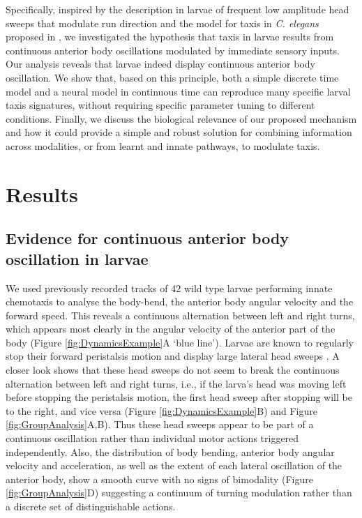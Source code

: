 \documentclass[11pt,a4paper]{article}
\begin{document}
Specifically, inspired by the description in larvae of frequent low amplitude head sweeps that modulate run direction \citep{gomez2014multilevel} and the model for taxis in {\it C. elegans} proposed in \citet{izquierdo2010evolution}, we investigated the hypothesis that taxis in larvae results from continuous anterior body oscillations modulated by immediate sensory inputs. 
Our analysis reveals that larvae indeed display continuous anterior body oscillation. We show that, based on this principle, both a simple discrete time model and a neural model in continuous time can reproduce many specific larval taxis signatures, without requiring specific parameter tuning to different conditions. Finally, we discuss the biological relevance of our proposed mechanism and how it could provide a simple and robust solution for combining information across modalities, or from learnt and innate pathways, to modulate taxis. 

\section{Results}
\subsection{Evidence for continuous anterior body oscillation in larvae}
 We used previously recorded tracks of 42 wild type larvae performing innate chemotaxis \citep{gomez2012active} to analyse the body-bend, the anterior body angular velocity and the forward speed. This reveals a continuous alternation between left and right turns, which appears most clearly in the angular velocity of the anterior part of the body (Figure \ref{fig:DynamicsExample}A ‘blue line’). Larvae are known to regularly stop their forward peristalsis motion and display large lateral head sweeps \citep{gomez2011active}. A closer look shows that these head sweeps do not seem to break the continuous alternation between left and right turns, i.e., if the larva’s head was moving left before stopping the peristalsis motion, the first head sweep after stopping will be to the right, and vice versa (Figure \ref{fig:DynamicsExample}B) and Figure \ref{fig:GroupAnalysis}A,B). Thus these head sweeps appear to be part of a continuous oscillation rather than individual motor actions triggered independently. Also, the distribution of body bending, anterior body angular velocity and acceleration, as well as the extent of each lateral oscillation of the anterior body, show a smooth curve with no signs of bimodality (Figure \ref{fig:GroupAnalysis}D) suggesting a continuum of turning modulation rather than a discrete set of distinguishable actions. 
\end{document}
